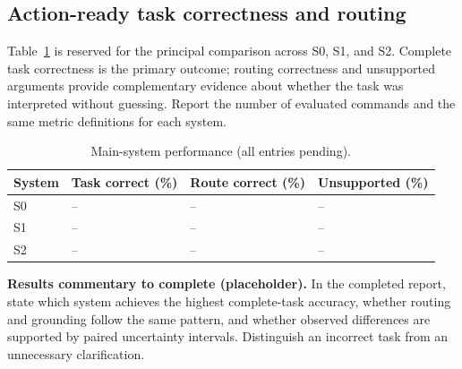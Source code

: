 \documentclass[10pt,conference]{IEEEtran}
\renewcommand{\arraystretch}{1.10}
\begin{document}
\subsection{Action-ready task correctness and routing}
Table~\ref{tab:mainresults} is reserved for the principal comparison across S0, S1, and S2. Complete task correctness is the primary outcome; routing correctness and unsupported arguments provide complementary evidence about whether the task was interpreted without guessing. Report the number of evaluated commands and the same metric definitions for each system.
\begin{table}[!tbp]
\caption{Main-system performance (all entries pending).}
\label{tab:mainresults}
\centering\small
\renewcommand{\arraystretch}{1.35}
\begin{tabularx}{\columnwidth}{@{}l>{\centering\arraybackslash}X>{\centering\arraybackslash}X>{\centering\arraybackslash}X@{}}
\toprule
\textbf{System} & \textbf{Task correct (\%)} & \textbf{Route correct (\%)} & \textbf{Unsupported (\%)}\\
\midrule
S0 & -- & -- & --\\
S1 & -- & -- & --\\
S2 & -- & -- & --\\
\bottomrule
\end{tabularx}
\end{table}
\noindent\textbf{Results commentary to complete (placeholder).}  In the completed report, state which system achieves the highest complete-task accuracy, whether routing and grounding follow the same pattern, and whether observed differences are supported by paired uncertainty intervals. Distinguish an incorrect task from an unnecessary clarification.

\FloatBarrier
\end{document}
